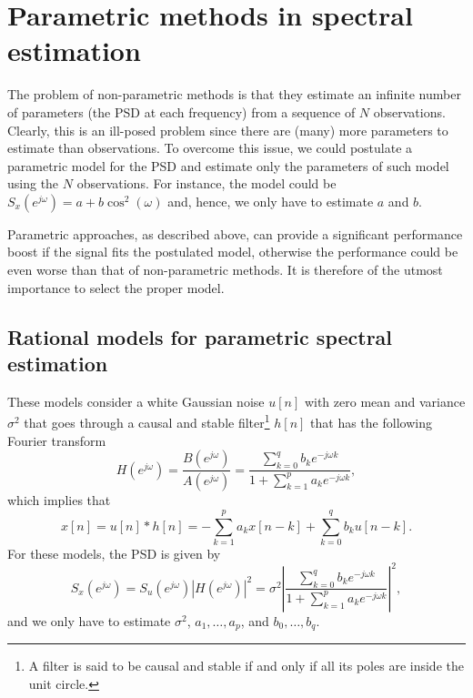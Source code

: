 \section{Parametric methods in spectral estimation}

The problem of non-parametric methods is that they estimate an infinite number of parameters (the PSD at each frequency) from a sequence of $N$ observations. Clearly, this is an ill-posed problem since there are (many) more parameters to estimate than observations. To overcome this issue, we could postulate a parametric model for the PSD and estimate only the parameters of such model using the $N$ observations. For instance, the model could be $S_x(e^{j \omega})  = a + b \cos^2(\omega)$ and, hence, we only have to estimate $a$ and $b$.

Parametric approaches, as described above, can provide a significant performance boost if the signal fits the postulated model, otherwise the performance could be even worse than that of non-parametric methods. It is therefore of the utmost importance to select the proper model.

\subsection{Rational models for parametric spectral estimation}

These models consider a white Gaussian noise $u[n]$ with zero mean and variance $\sigma^2$ that goes through a causal and stable filter\footnote{A filter is said to be causal and stable if and only if all its poles are inside the unit circle.} $h[n]$ that has the following Fourier transform
\begin{equation}
	H(e^{j \omega}) = \frac{B(e^{j \omega})}{A(e^{j \omega})} = \frac{\displaystyle \sum_{k = 0}^{q} b_k e^{-j \omega k}}{\displaystyle 1 + \sum_{k = 1}^{p} a_k e^{-j \omega k}},
\end{equation}
which implies that
\begin{equation}
	\label{eq:signal_model_ARMA}
	x[n] = u[n] \ast h[n] = - \sum_{k = 1}^{p} a_k x[n -k] + \sum_{k = 0}^{q} b_k u[n-k].
\end{equation}
For these models, the PSD  is given by
\begin{equation}
\label{eq:PSD_ARMA}
S_x(e^{j \omega}) = S_u(e^{j \omega}) |H(e^{j \omega})|^2 = \sigma^2 \left|\frac{\displaystyle \sum_{k = 0}^{q} b_k e^{-j \omega k}}{\displaystyle 1 + \sum_{k = 1}^{p} a_k e^{-j \omega k}}\right|^2,
\end{equation}
and we only have to estimate $\sigma^2$, $a_1, \ldots, a_p$, and $b_0, \ldots, b_q$. 

